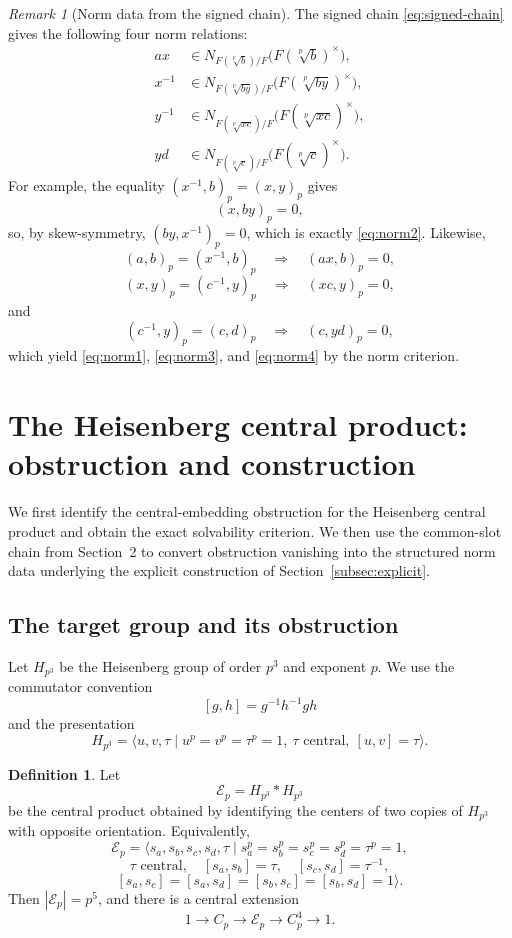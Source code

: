 \documentclass[12pt]{amsart}
\theoremstyle{definition}
\newtheorem{definition}[theorem]{Definition}
\theoremstyle{remark}
\newtheorem{remark}[theorem]{Remark}
\newcommand{\Hp}{H_{p^3}}
\newcommand{\E}{\mathcal E_p}
\begin{document}
\begin{remark}[Norm data from the signed chain]\label{rem:norm-data}
The signed chain \eqref{eq:signed-chain} gives the following four norm
relations:
\begin{align}
 ax &\in N_{F(\sqrt[p]{b})/F}
    \bigl(F(\sqrt[p]{b})^\times\bigr),\label{eq:norm1}\\
 x^{-1} &\in N_{F(\sqrt[p]{by})/F}
    \bigl(F(\sqrt[p]{by})^\times\bigr),\label{eq:norm2}\\
 y^{-1} &\in N_{F(\sqrt[p]{xc})/F}
    \bigl(F(\sqrt[p]{xc})^\times\bigr),\label{eq:norm3}\\
 yd &\in N_{F(\sqrt[p]{c})/F}
    \bigl(F(\sqrt[p]{c})^\times\bigr).\label{eq:norm4}
\end{align}
For example, the equality $(x^{-1},b)_p=(x,y)_p$ gives
\[
 (x,by)_p=0,
\]
so, by skew-symmetry, $(by,x^{-1})_p=0$, which is exactly
\eqref{eq:norm2}. Likewise,
\[
 (a,b)_p=(x^{-1},b)_p
 \quad\Longrightarrow\quad
 (ax,b)_p=0,
\]
\[
 (x,y)_p=(c^{-1},y)_p
 \quad\Longrightarrow\quad
 (xc,y)_p=0,
\]
and
\[
 (c^{-1},y)_p=(c,d)_p
 \quad\Longrightarrow\quad
 (c,yd)_p=0,
\]
which yield \eqref{eq:norm1}, \eqref{eq:norm3}, and \eqref{eq:norm4} by
the norm criterion.
\end{remark}

\section{The Heisenberg central product: obstruction and construction}

We first identify the central-embedding obstruction for the Heisenberg
central product and obtain the exact solvability criterion. We then use the
common-slot chain from Section~2 to convert obstruction vanishing into the
structured norm data underlying the explicit construction of
Section~\ref{subsec:explicit}.

\subsection{The target group and its obstruction}

Let $\Hp$ be the Heisenberg group of order $p^3$ and exponent $p$. We use
the commutator convention
\[
 [g,h]=g^{-1}h^{-1}gh
\]
and the presentation
\[
 \Hp=\langle u,v,\tau\mid
 u^p=v^p=\tau^p=1,\ \tau\text{ central},\ [u,v]=\tau\rangle.
\]

\begin{definition}\label{def:E}
Let
\[
 \E=\Hp*\Hp
\]
be the central product obtained by identifying the centers of two copies of
$\Hp$ with opposite orientation. Equivalently,
\[
 \E=\langle s_a,s_b,s_c,s_d,\tau\mid
 s_a^p=s_b^p=s_c^p=s_d^p=\tau^p=1,
\]
\[
 \tau\text{ central},\quad
 [s_a,s_b]=\tau,\quad [s_c,s_d]=\tau^{-1},
\]
\[
 [s_a,s_c]=[s_a,s_d]=[s_b,s_c]=[s_b,s_d]=1\rangle.
\]
Then $|\E|=p^5$, and there is a central extension
\begin{equation}\label{eq:E-extension}
 1\longrightarrow C_p\longrightarrow\E\longrightarrow C_p^4\longrightarrow1.
\end{equation}
\end{definition}
\end{document}
